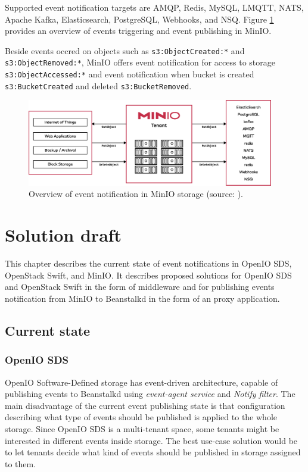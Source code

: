     Supported event notification targets are AMQP, Redis, MySQL, LMQTT, NATS, Apache Kafka, Elasticsearch, PostgreSQL, Webhooks, and NSQ. Figure \ref{fig:minio-monitoring} provides an overview of events triggering and event publishing in MinIO.

    Beside events occred on objects such as \texttt{s3:ObjectCreated:*} and \texttt{s3:ObjectRemoved:*}, MinIO offers event notification for access to storage \texttt{s3:ObjectAccessed:*} and event notification when bucket is created \texttt{s3:BucketCreated} and deleted \texttt{s3:BucketRemoved}.

    \begin{figure}[H]
        \centering
        \includegraphics[width=0.96\textwidth]{obrazky-figures/minio-monitoring.eps}
        \caption{Overview of event notification in MinIO storage (source: \cite{minioMonitoring}).}
        \label{fig:minio-monitoring}
    \end{figure}


\chapter{Solution draft}\label{chap:solution}
    This chapter describes the current state of event notifications in OpenIO SDS, OpenStack Swift, and MinIO. It describes proposed solutions for OpenIO SDS and OpenStack Swift in the form of middleware and for publishing events notification from MinIO to Beanstalkd in the form of an proxy application.
\section{Current state}
    \subsection{OpenIO SDS}
    OpenIO Software-Defined storage has event-driven architecture, capable of publishing events to Beanstalkd using \textit{event-agent service} and \textit{Notify filter}.
    The main disadvantage of the current event publishing state is that configuration describing what type of events should be published is applied to the whole storage. Since OpenIO SDS is a multi-tenant space, some tenants might be interested in different events inside storage. The best use-case solution would be to let tenants decide what kind of events should be published in storage assigned to them.


